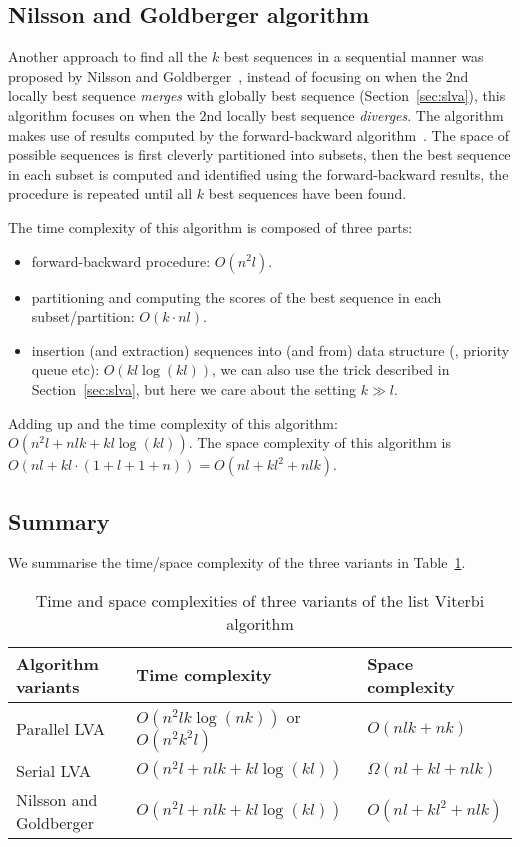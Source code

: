 \subsection{Nilsson and Goldberger algorithm}
\label{sec:nglva}

Another approach to find all the $k$ best sequences in a sequential manner was proposed by Nilsson and Goldberger~\cite{nilsson2001sequentially},
instead of focusing on when the $2$nd locally best sequence \textit{merges} with globally best sequence (Section~\ref{sec:slva}),
this algorithm focuses on when the $2$nd locally best sequence \textit{diverges}.
The algorithm makes use of results computed by the forward-backward algorithm~\cite{rabiner1989tutorial}.
The space of possible sequences is first cleverly partitioned into subsets, 
then the best sequence in each subset is computed and identified using the forward-backward results,
the procedure is repeated until all $k$ best sequences have been found.

The time complexity of this algorithm is composed of three parts:
\begin{itemize}
\item forward-backward procedure: $O(n^2 l)$.
\item partitioning and computing the scores of the best sequence in each subset/partition: $O(k \cdot nl)$.
\item insertion (and extraction) sequences into (and from) data structure (\eg, priority queue etc): $O(kl \log (kl))$,
      we can also use the trick described in Section~\ref{sec:slva}, but here we care about the setting $k \gg l$.
\end{itemize}
Adding up and the time complexity of this algorithm: $O \left( n^2 l + nlk + kl\log(kl) \right)$.
The space complexity of this algorithm is $O (nl + kl \cdot (1 + l + 1 + n) ) = O(nl + kl^2 + nlk)$.


\subsection{Summary}
We summarise the time/space complexity of the three variants in Table~\ref{tab:variants}.

\begin{table}[ht]
\caption{Time and space complexities of three variants of the list Viterbi algorithm}
\label{tab:variants}
\centering
\begin{tabular}{|l|l|l|} \hline
\textbf{Algorithm variants}  & \textbf{Time complexity} & \textbf{Space complexity} \\ \hline
Parallel LVA~\cite{seshadri1994list} & $O \left( n^2 lk \log(nk) \right)$ or $O \left( n^2 k^2 l \right)$ & $O(nlk + nk)$ \\ \hline
Serial LVA~\cite{seshadri1994list}   & $O \left( n^2 l + nlk + kl\log(kl) \right)$ & $\Omega(nl + kl + nlk)$ \\ \hline
Nilsson and Goldberger~\cite{nilsson2001sequentially} & $O \left( n^2 l + nlk + kl\log(kl) \right)$ & $O(nl + kl^2 + nlk)$ \\ \hline
\end{tabular}
\end{table}
